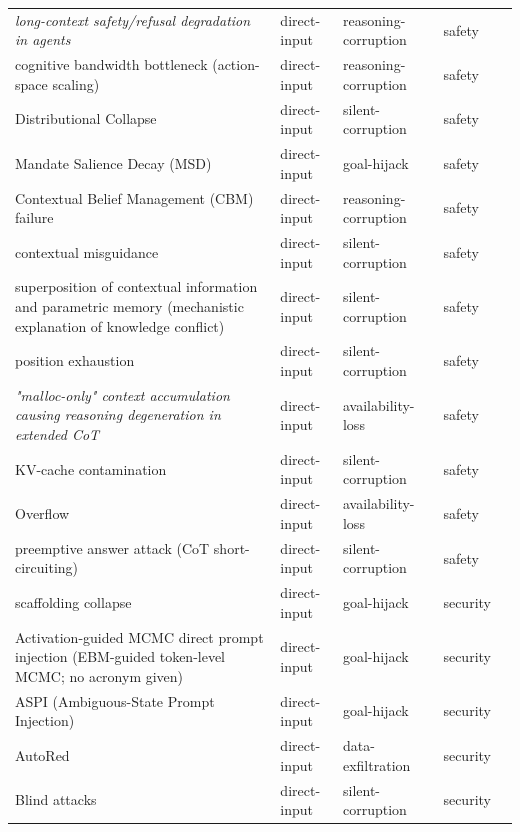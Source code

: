 \begin{longtable}{@{}>{\raggedright\arraybackslash}p{}llll@{}}
\emph{long-context safety/refusal degradation in agents} & direct-input & reasoning-corruption & safety & \cite{hadeliya-2025-refusals} \\
cognitive bandwidth bottleneck (action-space scaling) & direct-input & reasoning-corruption & safety & \cite{xu-2025-cognitive} \\
Distributional Collapse & direct-input & silent-corruption & safety & \cite{ebrahimzadeh-2026-not} \\
Mandate Salience Decay (MSD) & direct-input & goal-hijack & safety & \cite{safder-2026-finpersonabench} \\
Contextual Belief Management (CBM) failure & direct-input & reasoning-corruption & safety & \cite{xu-2026-should} \\
contextual misguidance & direct-input & silent-corruption & safety & \cite{wang-2026-alleviating} \\
superposition of contextual information and parametric memory (mechanistic explanation of knowledge conflict) & direct-input & silent-corruption & safety & \cite{li-2025-taming} \\
position exhaustion & direct-input & silent-corruption & safety & \cite{huo-2026-periodic} \\
\emph{"malloc-only" context accumulation causing reasoning degeneration in extended CoT} & direct-input & availability-loss & safety & \cite{zheng-2026-free} \\
KV-cache contamination & direct-input & silent-corruption & safety & \cite{kang-2026-promptactivation} \\
Overflow & direct-input & availability-loss & safety & \cite{feiglin-2026-benchoverflow} \\
preemptive answer attack (CoT short-circuiting) & direct-input & silent-corruption & safety & \cite{xu-2024-preemptive} \\
scaffolding collapse & direct-input & goal-hijack & security & \cite{shao-2026-mitigating} \\
Activation-guided MCMC direct prompt injection (EBM-guided token-level MCMC; no acronym given) & direct-input & goal-hijack & security & \cite{li-2025-transferable} \\
ASPI (Ambiguous-State Prompt Injection) & direct-input & goal-hijack & security & \cite{sehwag-2026-aspi} \\
AutoRed & direct-input & data-exfiltration & security & \cite{wang-2024-autored} \\
Blind attacks & direct-input & silent-corruption & security & \cite{liu-2025-counterfactual} \\

\end{longtable}
